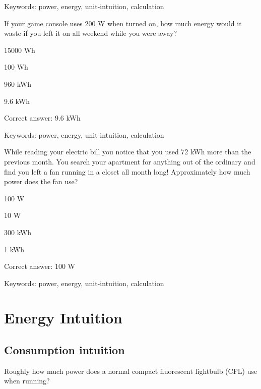 Keywords: power, energy, unit-intuition, calculation

\begin{question}
	\item If your game console uses 200 W when turned on, how much energy would it waste if you left it on all weekend while you were away?
\end{question}

\begin{answer}
	\item 15000 Wh
	\item 100 Wh
	\item 960 kWh
	\item 9.6 kWh
\end{answer}

Correct answer: 9.6 kWh

Keywords: power, energy, unit-intuition, calculation

\begin{question}
	\item While reading your electric bill you notice that you used 72 kWh more than the previous month. You search your apartment for anything out of the ordinary and find you left a fan running in a closet all month long! Approximately how much power does the fan use?
\end{question}

\begin{answer}
	\item 100 W
	\item 10 W
	\item 300 kWh
	\item 1 kWh
\end{answer}

Correct answer: 100 W

Keywords: power, energy, unit-intuition, calculation


\section{Energy Intuition}

\subsection{Consumption intuition}

\begin{question}
	\item Roughly how much power does a normal compact fluorescent lightbulb (CFL) use when running?
\end{question}

